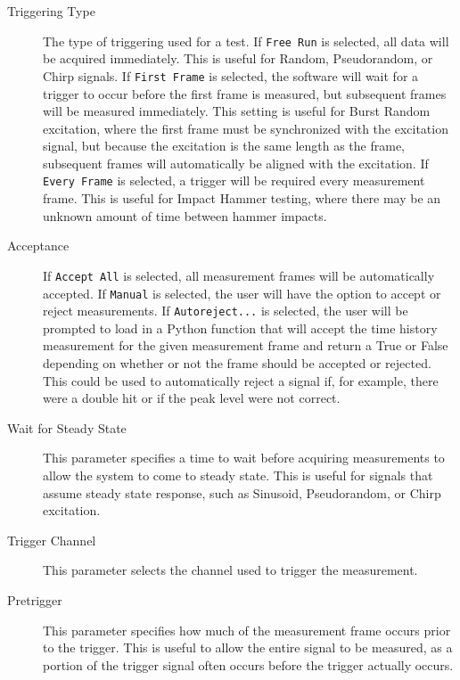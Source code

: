 \documentclass[pdf,12pt,report]{SANDreport}
\newcommand{\inlineCode}{\lstinline[basicstyle=\bfseries\ttfamily]}
\begin{document}
    \begin{description}
        \item[Triggering Type] The type of triggering used for a test.  If \inlineCode{Free Run} is selected, all data will be acquired immediately.  This is useful for Random, Pseudorandom, or Chirp signals.  If \inlineCode{First Frame} is selected, the software will wait for a trigger to occur before the first frame is measured, but subsequent frames will be measured immediately.  This setting is useful for Burst Random excitation, where the first frame must be synchronized with the excitation signal, but because the excitation is the same length as the frame, subsequent frames will automatically be aligned with the excitation.  If \inlineCode{Every Frame} is selected, a trigger will be required every measurement frame.  This is useful for Impact Hammer testing, where there may be an unknown amount of time between hammer impacts.
        
        \item[Acceptance] If \inlineCode{Accept All} is selected, all measurement frames will be automatically accepted.  If \inlineCode{Manual} is selected, the user will have the option to accept or reject measurements.  If \inlineCode{Autoreject...} is selected, the user will be prompted to load in a Python function that will accept the time history measurement for the given measurement frame and return a True or False depending on whether or not the frame should be accepted or rejected.  This could be used to automatically reject a signal if, for example, there were a double hit or if the peak level were not correct.
        
        \item[Wait for Steady State] This parameter specifies a time to wait before acquiring measurements to allow the system to come to steady state.  This is useful for signals that assume steady state response, such as Sinusoid, Pseudorandom, or Chirp excitation.
        
        \item[Trigger Channel] This parameter selects the channel used to trigger the measurement.
        
        \item[Pretrigger] This parameter specifies how much of the measurement frame occurs prior to the trigger.  This is useful to allow the entire signal to be measured, as a portion of the trigger signal often occurs before the trigger actually occurs.
        

\end{description}
\end{document}
